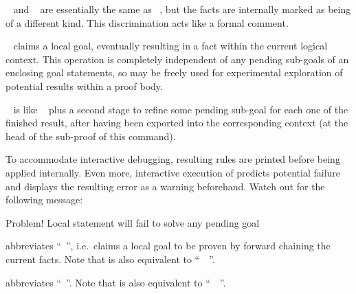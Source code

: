 \begin{isabellebody}
\begin{isamarkuptext}
\begin{descr}
  \item [\isa{\isacommand{theorem}}~\isa{a{\isacharcolon}\ {\isasymphi}} and \isa{\isacommand{corollary}}~\isa{a{\isacharcolon}\ {\isasymphi}}] are essentially the same as ~, but the facts are internally marked as
  being of a different kind.  This discrimination acts like a formal
  comment.
  
  \item [\isa{\isacommand{have}}~\isa{a{\isacharcolon}\ {\isasymphi}}] claims a local goal,
  eventually resulting in a fact within the current logical context.
  This operation is completely independent of any pending sub-goals of
  an enclosing goal statements, so  may be freely
  used for experimental exploration of potential results within a
  proof body.
  
  \item [\isa{\isacommand{show}}~\isa{a{\isacharcolon}\ {\isasymphi}}] is like ~ plus a second stage to refine some pending
  sub-goal for each one of the finished result, after having been
  exported into the corresponding context (at the head of the
  sub-proof of this  command).
  
  To accommodate interactive debugging, resulting rules are printed
  before being applied internally.  Even more, interactive execution
  of  predicts potential failure and displays the
  resulting error as a warning beforehand.  Watch out for the
  following message:

  \begin{ttbox}
  Problem! Local statement will fail to solve any pending goal
  \end{ttbox}
  
  \item [\isa{\isacommand{hence}}] abbreviates ``~'', i.e.\ claims a local goal to be proven by forward
  chaining the current facts.  Note that  is also
  equivalent to ``~~''.
  
  \item [\isa{\isacommand{thus}}] abbreviates ``~''.  Note that  is also equivalent to
  ``~~''.
  

\end{descr}
\end{isamarkuptext}
\end{isabellebody}
